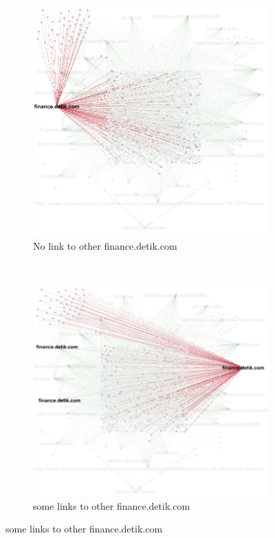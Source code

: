 \documentclass[a4paper,12pt]{article}
\begin{document}
\begin{figure}
        \centering
        \begin{subfigure}[a]{0.8\textwidth}
                \includegraphics[width=\textwidth]{Outdegree1.png}
                \caption{No link to other finance.detik.com }
               
        \end{subfigure}
        ~ %
        
        \begin{subfigure}[b]{0.8\textwidth}
                \includegraphics[width=\textwidth]{Outdegree2.png}
                \caption{some links to other finance.detik.com}
                

\end{subfigure}
\end{figure}
\end{document}
